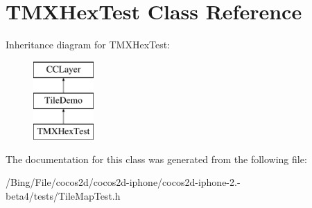 \hypertarget{interface_t_m_x_hex_test}{\section{T\-M\-X\-Hex\-Test Class Reference}
\label{interface_t_m_x_hex_test}
}
Inheritance diagram for T\-M\-X\-Hex\-Test\-:\begin{figure}[H]
\begin{center}
\leavevmode
\includegraphics[height=3.000000cm]{interface_t_m_x_hex_test}
\end{center}
\end{figure}


The documentation for this class was generated from the following file\-:\begin{DoxyCompactItemize}
\item 
/\-Bing/\-File/cocos2d/cocos2d-\/iphone/cocos2d-\/iphone-\/2.-\/beta4/tests/Tile\-Map\-Test.\-h\end{DoxyCompactItemize}
